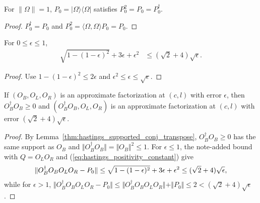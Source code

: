 \begin{lemma}
    \label{thm:hastings_rank_one_projection}
    \leanok
    For $\|\Omega\|=1$, $P_0=|\Omega\rangle\langle\Omega|$ satisfies
    $P_0^2=P_0=P_0^\dagger$.
\end{lemma}
\begin{proof}\leanok
    $P_0^\dagger=P_0$ and $P_0^2=\langle\Omega,\Omega\rangle P_0=P_0$.
\end{proof}

\begin{lemma}
    \label{thm:hastings_positivity_constant}
    \leanok
    For $0\le\epsilon\le1$,
    \begin{align}
        \sqrt{1-(1-\epsilon)^2}+3\epsilon+\epsilon^2 & \le(\sqrt2+4)\sqrt\epsilon.
        \label{eq:hastings_positivity_constant}
    \end{align}
\end{lemma}
\begin{proof}\leanok
    Use $1-(1-\epsilon)^2\le2\epsilon$ and $\epsilon^2\le\epsilon\le\sqrt\epsilon$.
\end{proof}

\begin{lemma}
    \label{thm:hastings_positive_repair}
    \leanok
    If $(O_B,O_L,O_R)$ is an approximate factorization at $(c,l)$ with error
    $\epsilon$, then $O_B^\dagger O_B\ge0$ and $(O_B^\dagger O_B,O_L,O_R)$ is
    an approximate factorization at $(c,l)$ with error
    $(\sqrt2+4)\sqrt\epsilon$.
\end{lemma}
\begin{proof}\leanok
    By Lemma~\ref{thm:hastings_supported_conj_transpose}, $O_B^\dagger O_B\ge0$
    has the same support as $O_B$ and $\Vert O_B^\dagger O_B\Vert=\Vert O_B\Vert^2\le1$.
    For $\epsilon\le1$, the note-added bound with $Q=O_LO_R$ and
    (\ref{eq:hastings_positivity_constant}) give
    \begin{align}
        \Vert O_B^\dagger O_BO_LO_R-P_0\Vert
        \le\sqrt{1-(1-\epsilon)^2}+3\epsilon+\epsilon^2
        \le(\sqrt2+4)\sqrt\epsilon,
        \notag
    \end{align}
    while for $\epsilon>1$,
    $\Vert O_B^\dagger O_BO_LO_R-P_0\Vert\le\Vert O_B^\dagger O_BO_LO_R\Vert+\Vert P_0\Vert\le2<(\sqrt2+4)\sqrt\epsilon$.
\end{proof}

